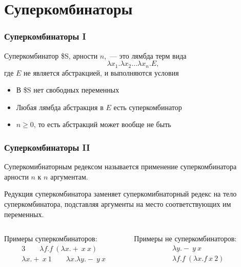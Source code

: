 \documentclass[aspectratio=169]{beamer}
\begin{document}
\section{Суперкомбинаторы}

\begin{frame}
    \frametitle{Суперкомбинаторы I}

    \begin{definition}
        Суперкомбинатор \${}S, арности $n$,~--- это лямбда терм вида
        \[\lambda x_1. \lambda x_2 \dots \lambda x_n. E,\]
        где $E$ не является абстракцией, и выполняются условия
        \begin{itemize}
            \item В \${}S нет свободных переменных
            \item Любая лямбда абстракция в $E$ есть суперкомбинатор
            \item $n \ge 0$, то есть абстракций может вообще не быть
        \end{itemize}
    \end{definition}

\end{frame}

\begin{frame}
    \frametitle{Суперкомбинаторы II}

    \begin{definition}
        Суперкомибнаторным редексом называется применение суперкомбинатора арности $n$ к $n$ аргументам.

        Редукция суперкомбинатора заменяет суперкомибнаторный редекс на тело суперкомбинатора, подставляя аргументы на место соответствующих им переменных.
    \end{definition}

    \begin{columns}
        \begin{column}{0.5\textwidth}
            Примеры суперкомбинаторов:
            \begin{gather*}
                3 \qquad \lambda f. f\ (\lambda x. +\ x\ x) \\
                \lambda x.+\ x\ 1 \qquad \lambda x. \lambda y.-\ y\ x
            \end{gather*}
        \end{column}
        \begin{column}{0.5\textwidth}
            Примеры не суперкомбинаторов:
            \begin{gather*}
                \lambda y.-\ y\ x\\
                \lambda f.f\ (\lambda x.f\ x\ 2)
            \end{gather*}
        \end{column}
    \end{columns}

\end{frame}
\end{document}
